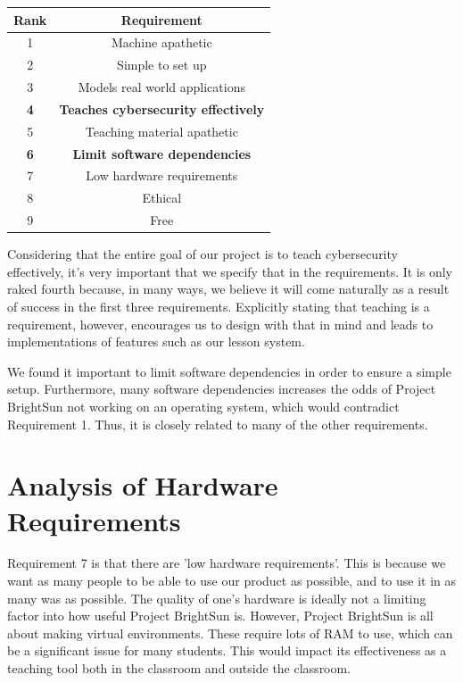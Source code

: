 \documentclass[openright]{report}
\begin{document}
\begin{center}
    \begin{tabular}{c | c } 
        \hline
        Rank & Requirement \\ [0.5ex] 
        \hline\hline
        1 & Machine apathetic \\ 
        \hline
        2 & Simple to set up \\
        \hline
        3 & Models real world applications \\
        \hline
        \textbf{4} & \textbf{Teaches cybersecurity effectively} \\
        \hline
        5 & Teaching material apathetic \\
        \hline
        \textbf{6} & \textbf{Limit software dependencies} \\
        \hline
        7 & Low hardware requirements \\
        \hline
        8  &  Ethical \\ 
        \hline
        9  &  Free \\[1ex] 
    \end{tabular}
\end{center}

\par Considering that the entire goal of our project is to teach cybersecurity effectively, it's very important that we specify that in the requirements. It is only raked fourth because, in many ways, we believe it will come naturally as a result of success in the first three requirements. Explicitly stating that teaching is a requirement, however, encourages us to design with that in mind and leads to implementations of features such as our lesson system.

\par We found it important to limit software dependencies in order to ensure a simple setup. Furthermore, many software dependencies increases the odds of Project BrightSun not working on an operating system, which would contradict Requirement 1. Thus, it is closely related to many of the other requirements.

\section{Analysis of Hardware Requirements}

\par Requirement 7 is that there are 'low hardware requirements'. This is because we want as many people to be able to use our product as possible, and to use it in as many was as possible. The quality of one's hardware is ideally not a limiting factor into how useful Project BrightSun is. However, Project BrightSun is all about making virtual environments. These require lots of RAM to use, which can be a significant issue for many students. This would impact its effectiveness as a teaching tool both in the classroom and outside the classroom.
\end{document}
